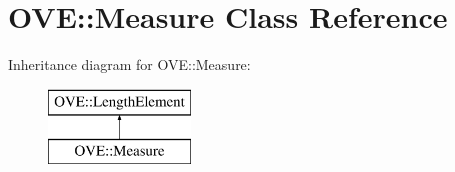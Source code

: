 \hypertarget{class_o_v_e_1_1_measure}{}\section{O\+VE\+:\+:Measure Class Reference}
\label{class_o_v_e_1_1_measure}
Inheritance diagram for O\+VE\+:\+:Measure\+:\begin{figure}[H]
\begin{center}
\leavevmode
\includegraphics[height=2.000000cm]{class_o_v_e_1_1_measure}
\end{center}
\end{figure}
